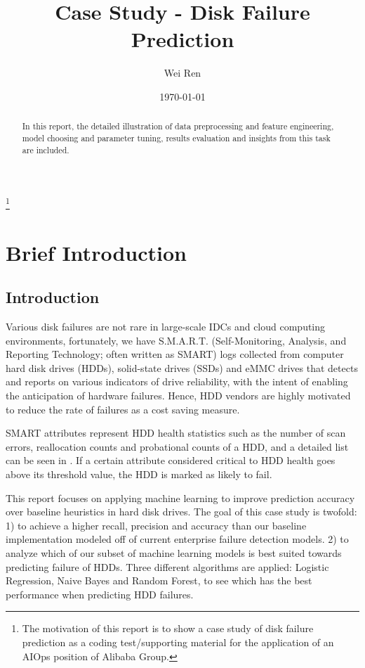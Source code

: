 \documentclass[12pt,a4paper,english]{amsart}
\begin{document}
\title{Case Study - Disk Failure Prediction}%
\author{Wei Ren}%
%

\date{\today}
\thanks{The motivation of this report is to show a case study of disk failure prediction as a coding test/supporting material for the application of an AIOps position of Alibaba Group.}
\begin{abstract}
 In this report, the detailed illustration of data preprocessing and feature engineering, model choosing and parameter tuning, results evaluation and insights from this task are included.
\end{abstract}
\maketitle
\section{Brief Introduction}

\subsection{Introduction}

Various disk failures are not rare in large-scale IDCs and cloud computing environments, fortunately, we have S.M.A.R.T. (Self-Monitoring, Analysis, and Reporting Technology; often written as SMART) logs collected from computer hard disk drives (HDDs), solid-state drives (SSDs) and eMMC drives that detects and reports on various indicators of drive reliability, with the intent of enabling the anticipation of hardware failures. Hence, HDD vendors are highly motivated to reduce the rate of failures as a cost saving measure.

SMART attributes represent HDD health statistics such as the number of scan errors, reallocation counts and probational counts of a HDD, and a detailed list can be seen in \cite{Wiki-smart}. If a certain attribute considered critical to HDD health goes above its threshold value, the HDD is marked as likely to fail\cite{Pinheiro2007}.

This report focuses on applying machine learning to improve prediction accuracy over baseline heuristics in hard disk drives. The goal of this case study is twofold: 1) to achieve a higher recall, precision and accuracy than our baseline implementation modeled off of current enterprise failure detection models. 2) to analyze which of our subset of machine learning models is best suited towards predicting failure of HDDs. Three different algorithms are applied: Logistic Regression, Naive Bayes and Random Forest, to see which has the best performance when predicting HDD failures.
\end{document}
